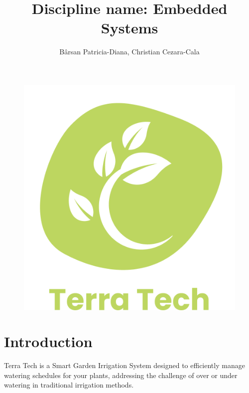 \documentclass[12pt]{article}
\title{Discipline name: Embedded Systems}
\author{Bârsan Patricia-Diana, Christian Cezara-Cala}
\begin{document}

\begin{figure}
\centering
\includegraphics[width=0.8\linewidth]{images/image11.png}
\end{figure}

\maketitle

\newpage

\section{Introduction}

Terra Tech is a Smart Garden Irrigation System designed to efficiently manage watering schedules for your plants, addressing the challenge of over or under watering in traditional irrigation methods.\\
\end{document}
